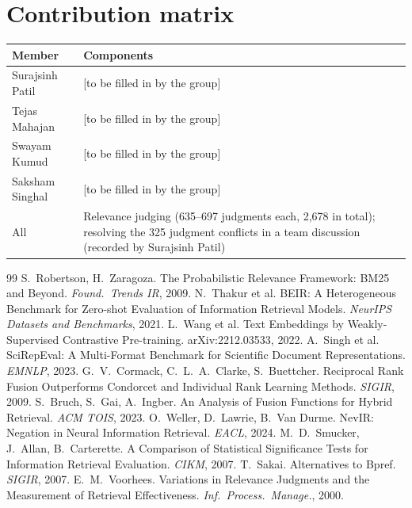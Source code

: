 \documentclass[10pt,a4paper]{article}
\newcommand{\pending}[1]{\textcolor{red!70!black}{[#1]}}
\begin{document}
\section*{Contribution matrix}
\begin{tabularx}{\linewidth}{@{}l X@{}}
\toprule
Member & Components\\
\midrule
Surajsinh Patil & \pending{to be filled in by the group}\\
Tejas Mahajan & \pending{to be filled in by the group}\\
Swayam Kumud & \pending{to be filled in by the group}\\
Saksham Singhal & \pending{to be filled in by the group}\\
All & Relevance judging (635--697 judgments each, 2{,}678 in total); resolving the 325 judgment conflicts
in a team discussion (recorded by Surajsinh Patil)\\
\bottomrule
\end{tabularx}

\begin{thebibliography}{99}\small
{} S.~Robertson, H.~Zaragoza. The Probabilistic Relevance Framework: BM25 and Beyond. \emph{Found.\ Trends IR}, 2009.
 N.~Thakur et al. BEIR: A Heterogeneous Benchmark for Zero-shot Evaluation of Information Retrieval Models. \emph{NeurIPS Datasets and Benchmarks}, 2021.
 L.~Wang et al. Text Embeddings by Weakly-Supervised Contrastive Pre-training. arXiv:2212.03533, 2022.
 A.~Singh et al. SciRepEval: A Multi-Format Benchmark for Scientific Document Representations. \emph{EMNLP}, 2023.
 G.~V.~Cormack, C.~L.~A.~Clarke, S.~Buettcher. Reciprocal Rank Fusion Outperforms Condorcet and Individual Rank Learning Methods. \emph{SIGIR}, 2009.
 S.~Bruch, S.~Gai, A.~Ingber. An Analysis of Fusion Functions for Hybrid Retrieval. \emph{ACM TOIS}, 2023.
 O.~Weller, D.~Lawrie, B.~Van Durme. NevIR: Negation in Neural Information Retrieval. \emph{EACL}, 2024.
 M.~D.~Smucker, J.~Allan, B.~Carterette. A Comparison of Statistical Significance Tests for Information Retrieval Evaluation. \emph{CIKM}, 2007.
 T.~Sakai. Alternatives to Bpref. \emph{SIGIR}, 2007.
 E.~M.~Voorhees. Variations in Relevance Judgments and the Measurement of Retrieval Effectiveness. \emph{Inf.\ Process.\ Manage.}, 2000.
\end{thebibliography}
\end{document}
